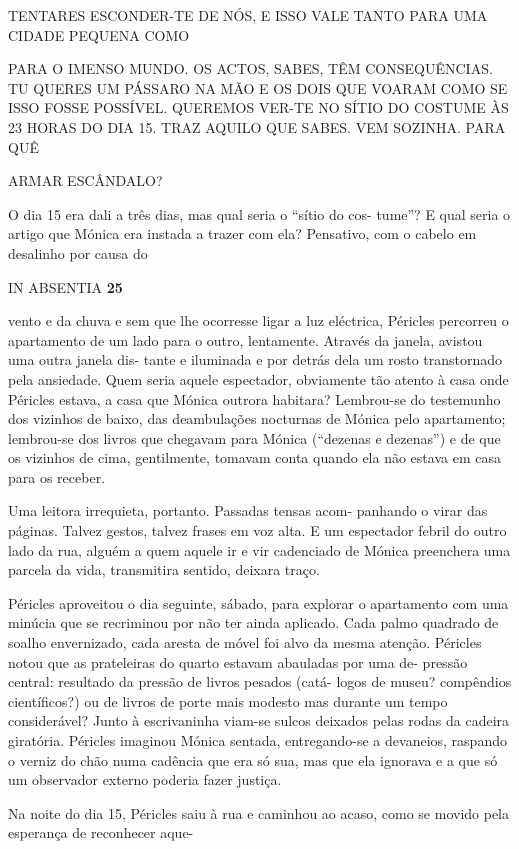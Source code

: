 TENTARES ESCONDER-TE DE NÓS, E ISSO VALE TANTO PARA UMA CIDADE PEQUENA
COMO

PARA O IMENSO MUNDO. OS ACTOS, SABES, TÊM CONSEQUÊNCIAS. TU QUERES UM
PÁSSARO NA MÃO E OS DOIS QUE VOARAM COMO SE ISSO FOSSE POSSÍVEL.
QUEREMOS VER-TE NO SÍTIO DO COSTUME ÀS 23 HORAS DO DIA 15. TRAZ AQUILO
QUE SABES. VEM SOZINHA. PARA QUÊ

ARMAR ESCÂNDALO?

O dia 15 era dali a três dias, mas qual seria o ``sítio do cos- tume''?
E qual seria o artigo que Mónica era instada a trazer com ela?
Pensativo, com o cabelo em desalinho por causa do

IN ABSENTIA \textbf{25}

vento e da chuva e sem que lhe ocorresse ligar a luz eléctrica, Péricles
percorreu o apartamento de um lado para o outro, lentamente. Através da
janela, avistou uma outra janela dis- tante e iluminada e por detrás
dela um rosto transtornado pela ansiedade. Quem seria aquele espectador,
obviamente tão atento à casa onde Péricles estava, a casa que Mónica
outrora habitara? Lembrou-se do testemunho dos vizinhos de baixo, das
deambulações nocturnas de Mónica pelo apartamento; lembrou-se dos livros
que chegavam para Mónica (``dezenas e dezenas'') e de que os vizinhos de
cima, gentilmente, tomavam conta quando ela não estava em casa para os
receber.

Uma leitora irrequieta, portanto. Passadas tensas acom- panhando o virar
das páginas. Talvez gestos, talvez frases em voz alta. E um espectador
febril do outro lado da rua, alguém a quem aquele ir e vir cadenciado de
Mónica preenchera uma parcela da vida, transmitira sentido, deixara
traço.

Péricles aproveitou o dia seguinte, sábado, para explorar o apartamento
com uma minúcia que se recriminou por não ter ainda aplicado. Cada palmo
quadrado de soalho envernizado, cada aresta de móvel foi alvo da mesma
atenção. Péricles notou que as prateleiras do quarto estavam abauladas
por uma de- pressão central: resultado da pressão de livros pesados
(catá- logos de museu? compêndios científicos?) ou de livros de porte
mais modesto mas durante um tempo considerável? Junto à escrivaninha
viam-se sulcos deixados pelas rodas da cadeira giratória. Péricles
imaginou Mónica sentada, entregando-se a devaneios, raspando o verniz do
chão numa cadência que era só sua, mas que ela ignorava e a que só um
observador externo poderia fazer justiça.

Na noite do dia 15, Péricles saiu à rua e caminhou ao acaso, como se
movido pela esperança de reconhecer aque-


